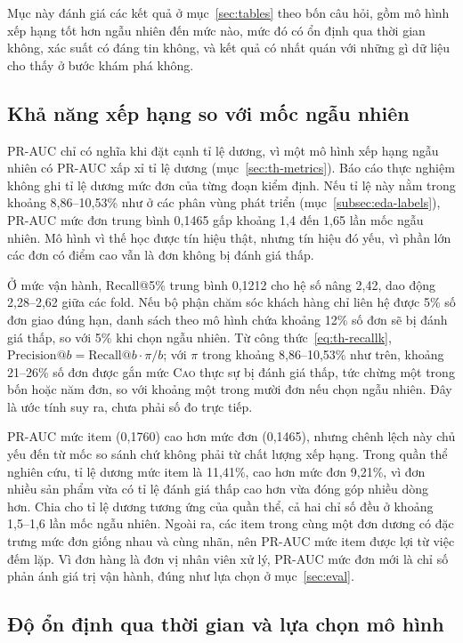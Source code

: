 \documentclass[12pt,a4paper]{report}
\begin{document}
Mục này đánh giá các kết quả ở mục~\ref{sec:tables} theo bốn câu hỏi, gồm mô hình xếp hạng tốt hơn ngẫu nhiên đến mức nào, mức đó có ổn định qua thời gian không, xác suất có đáng tin không, và kết quả có nhất quán với những gì dữ liệu cho thấy ở bước khám phá không.

\subsection{Khả năng xếp hạng so với mốc ngẫu nhiên}\label{sec:analysis-ranking}

PR-AUC chỉ có nghĩa khi đặt cạnh tỉ lệ dương, vì một mô hình xếp hạng ngẫu nhiên có PR-AUC xấp xỉ tỉ lệ dương (mục~\ref{sec:th-metrics}). Báo cáo thực nghiệm không ghi tỉ lệ dương mức đơn của từng đoạn kiểm định. Nếu tỉ lệ này nằm trong khoảng 8,86--10,53\% như ở các phân vùng phát triển (mục~\ref{subsec:eda-labels}), PR-AUC mức đơn trung bình 0,1465 gấp khoảng 1,4 đến 1,65 lần mốc ngẫu nhiên. Mô hình vì thế học được tín hiệu thật, nhưng tín hiệu đó yếu, vì phần lớn các đơn có điểm cao vẫn là đơn không bị đánh giá thấp.

Ở mức vận hành, Recall@5\% trung bình 0,1212 cho hệ số nâng 2,42, dao động 2,28--2,62 giữa các fold. Nếu bộ phận chăm sóc khách hàng chỉ liên hệ được 5\% số đơn giao đúng hạn, danh sách theo mô hình chứa khoảng 12\% số đơn sẽ bị đánh giá thấp, so với 5\% khi chọn ngẫu nhiên. Từ công thức~\eqref{eq:th-recallk}, $\mathrm{Precision@}b = \mathrm{Recall@}b \cdot \pi / b$; với $\pi$ trong khoảng 8,86--10,53\% như trên, khoảng 21--26\% số đơn được gắn mức \textsc{Cao} thực sự bị đánh giá thấp, tức chừng một trong bốn hoặc năm đơn, so với khoảng một trong mười đơn nếu chọn ngẫu nhiên. Đây là ước tính suy ra, chưa phải số đo trực tiếp.

PR-AUC mức item (0,1760) cao hơn mức đơn (0,1465), nhưng chênh lệch này chủ yếu đến từ mốc so sánh chứ không phải từ chất lượng xếp hạng. Trong quần thể nghiên cứu, tỉ lệ dương mức item là 11,41\%, cao hơn mức đơn 9,21\%, vì đơn nhiều sản phẩm vừa có tỉ lệ đánh giá thấp cao hơn vừa đóng góp nhiều dòng hơn. Chia cho tỉ lệ dương tương ứng của quần thể, cả hai chỉ số đều ở khoảng 1,5--1,6 lần mốc ngẫu nhiên. Ngoài ra, các item trong cùng một đơn dương có đặc trưng mức đơn giống nhau và cùng nhãn, nên PR-AUC mức item được lợi từ việc đếm lặp. Vì đơn hàng là đơn vị nhân viên xử lý, PR-AUC mức đơn mới là chỉ số phản ánh giá trị vận hành, đúng như lựa chọn ở mục~\ref{sec:eval}.

\subsection{Độ ổn định qua thời gian và lựa chọn mô hình}\label{sec:analysis-stability}
\end{document}
